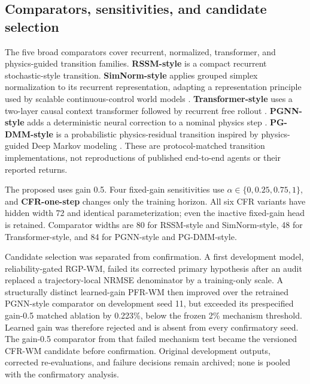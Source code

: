 \subsection{Comparators, sensitivities, and candidate selection}

The five broad comparators cover recurrent, normalized, transformer, and
physics-guided transition families. \textbf{RSSM-style} is a compact recurrent
stochastic-style transition. \textbf{SimNorm-style} applies grouped simplex
normalization to its recurrent representation, adapting a representation
principle used by scalable continuous-control world models
\cite{hansen2023_td_mpc2_scalable_robust_world}. \textbf{Transformer-style} uses a
two-layer causal context transformer followed by recurrent free rollout
\cite{micheli2022_transformers_are_sample_efficient_world}. \textbf{PGNN-style}
adds a deterministic neural correction to a nominal physics step
\cite{robinson2022_physics_guided_neural_networks_for}. \textbf{PG-DMM-style} is a
probabilistic physics-residual transition inspired by physics-guided Deep
Markov modeling \cite{liu2022_physics_guided_deep_markov_models}. These are
protocol-matched transition implementations, not reproductions of published
end-to-end agents or their reported returns.

The proposed \textbf{\method} uses gain 0.5. Four fixed-gain sensitivities use
$\alpha\in\{0,0.25,0.75,1\}$, and \textbf{CFR-one-step} changes only the
training horizon. All six CFR variants have hidden width 72 and identical
parameterization; even the inactive fixed-gain head is retained. Comparator
widths are 80 for RSSM-style and SimNorm-style, 48 for Transformer-style, and
84 for PGNN-style and PG-DMM-style.

Candidate selection was separated from confirmation. A first development
model, reliability-gated RGP-WM, failed its corrected primary hypothesis after
an audit replaced a trajectory-local NRMSE denominator by a training-only
scale. A structurally distinct learned-gain PFR-WM then improved over the retrained
PGNN-style comparator on development seed 11, but exceeded its prespecified gain-0.5 matched
ablation by 0.223\%, below the frozen 2\% mechanism threshold. Learned
gain was therefore rejected and is absent from every confirmatory seed. The
gain-0.5 comparator from that failed mechanism test became the versioned
CFR-WM candidate before confirmation. Original development outputs, corrected
re-evaluations, and failure decisions remain archived; none is pooled with the
confirmatory analysis.

